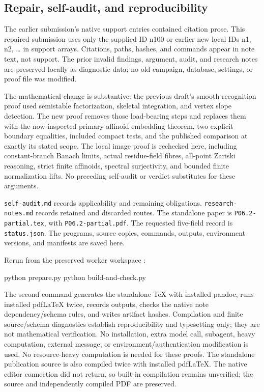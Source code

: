 \documentclass[
  11pt,
]{article}
\newenvironment{Shaded}{}{}
\newcommand{\ExtensionTok}[1]{#1}
\newcommand{\NormalTok}[1]{#1}
\begin{document}
\subsection{Repair, self-audit, and
reproducibility}\label{repair-self-audit-and-reproducibility}

The earlier submission's native support entries contained citation
prose. This repaired submission uses only the supplied ID n100 or
earlier new local IDs n1, n2, \ldots{} in support arrays. Citations,
paths, hashes, and commands appear in note text, not support. The prior
invalid findings, argument, audit, and research notes are preserved
locally as diagnostic data; no old campaign, database, settings, or
proof file was modified.

The mathematical change is substantive: the previous draft's smooth
recognition proof used semistable factorization, skeletal integration,
and vertex slope detection. The new proof removes those load-bearing
steps and replaces them with the now-inspected primary affinoid
embedding theorem, two explicit boundary equalities, included compact
tests, and the published comparison at exactly its stated scope. The
local image proof is rechecked here, including constant-branch Banach
limits, actual residue-field fibres, all-point Zariski reasoning, strict
finite affinoids, spectral surjectivity, and bounded finite
normalization lifts. No preceding self-audit or verdict substitutes for
these arguments.

\texttt{self-audit.md} records applicability and remaining obligations.
\texttt{research-notes.md} records retained and discarded routes. The
standalone paper is \texttt{P06.2-partial.tex}, with
\texttt{P06.2-partial.pdf}. The requested five-field record is
\texttt{status.json}. The programs, source copies, commands, outputs,
environment versions, and manifests are saved here.

Rerun from the preserved worker workspace
:

\begin{Shaded}
\begin{Highlighting}[]
\ExtensionTok{python}\NormalTok{ prepare.py}
\ExtensionTok{python}\NormalTok{ build{-}and{-}check.py}
\end{Highlighting}
\end{Shaded}

The second command generates the standalone TeX with installed pandoc,
runs installed pdfLaTeX twice, records outputs, checks the native note
dependency/schema rules, and writes artifact hashes. Compilation and
finite source/schema diagnostics establish reproducibility and
typesetting only; they are not mathematical verification. No
installation, extra model call, subagent, heavy computation, external
message, or environment/authentication modification is used. No
resource-heavy computation is needed for these proofs. The standalone
publication source is also compiled twice with installed pdfLaTeX.
The native editor connection did not return, so built-in compilation
remains unverified; the source and independently compiled PDF are
preserved.
\end{document}
